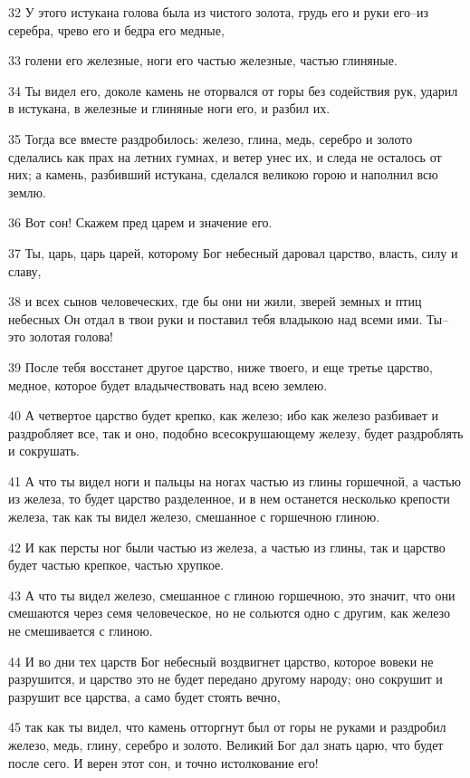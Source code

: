\par 32 У этого истукана голова была из чистого золота, грудь его и руки его--из серебра, чрево его и бедра его медные,
\par 33 голени его железные, ноги его частью железные, частью глиняные.
\par 34 Ты видел его, доколе камень не оторвался от горы без содействия рук, ударил в истукана, в железные и глиняные ноги его, и разбил их.
\par 35 Тогда все вместе раздробилось: железо, глина, медь, серебро и золото сделались как прах на летних гумнах, и ветер унес их, и следа не осталось от них; а камень, разбивший истукана, сделался великою горою и наполнил всю землю.
\par 36 Вот сон! Скажем пред царем и значение его.
\par 37 Ты, царь, царь царей, которому Бог небесный даровал царство, власть, силу и славу,
\par 38 и всех сынов человеческих, где бы они ни жили, зверей земных и птиц небесных Он отдал в твои руки и поставил тебя владыкою над всеми ими. Ты--это золотая голова!
\par 39 После тебя восстанет другое царство, ниже твоего, и еще третье царство, медное, которое будет владычествовать над всею землею.
\par 40 А четвертое царство будет крепко, как железо; ибо как железо разбивает и раздробляет все, так и оно, подобно всесокрушающему железу, будет раздроблять и сокрушать.
\par 41 А что ты видел ноги и пальцы на ногах частью из глины горшечной, а частью из железа, то будет царство разделенное, и в нем останется несколько крепости железа, так как ты видел железо, смешанное с горшечною глиною.
\par 42 И как персты ног были частью из железа, а частью из глины, так и царство будет частью крепкое, частью хрупкое.
\par 43 А что ты видел железо, смешанное с глиною горшечною, это значит, что они смешаются через семя человеческое, но не сольются одно с другим, как железо не смешивается с глиною.
\par 44 И во дни тех царств Бог небесный воздвигнет царство, которое вовеки не разрушится, и царство это не будет передано другому народу; оно сокрушит и разрушит все царства, а само будет стоять вечно,
\par 45 так как ты видел, что камень отторгнут был от горы не руками и раздробил железо, медь, глину, серебро и золото. Великий Бог дал знать царю, что будет после сего. И верен этот сон, и точно истолкование его!
